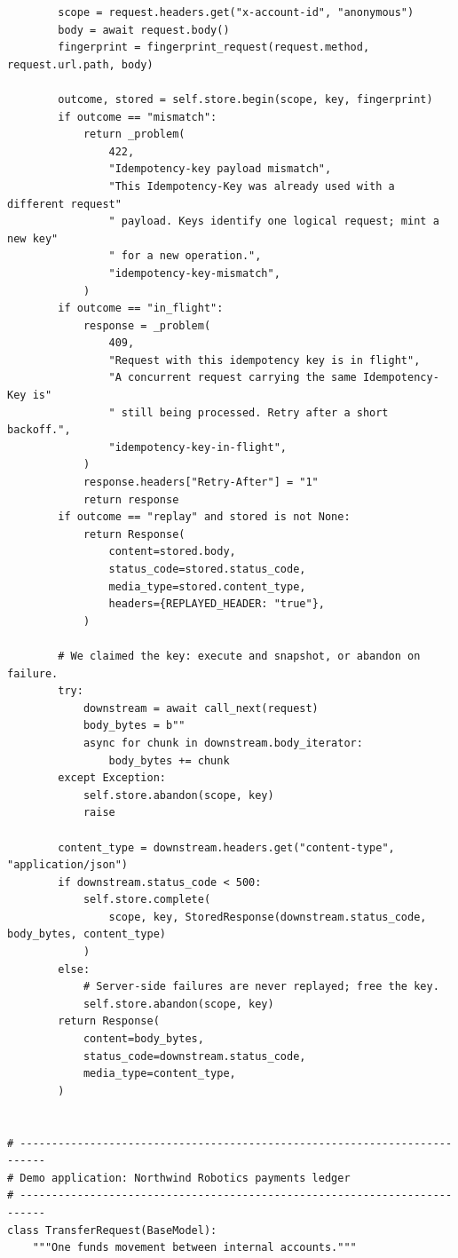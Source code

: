 \begin{verbatim}
        scope = request.headers.get("x-account-id", "anonymous")
        body = await request.body()
        fingerprint = fingerprint_request(request.method, request.url.path, body)

        outcome, stored = self.store.begin(scope, key, fingerprint)
        if outcome == "mismatch":
            return _problem(
                422,
                "Idempotency-key payload mismatch",
                "This Idempotency-Key was already used with a different request"
                " payload. Keys identify one logical request; mint a new key"
                " for a new operation.",
                "idempotency-key-mismatch",
            )
        if outcome == "in_flight":
            response = _problem(
                409,
                "Request with this idempotency key is in flight",
                "A concurrent request carrying the same Idempotency-Key is"
                " still being processed. Retry after a short backoff.",
                "idempotency-key-in-flight",
            )
            response.headers["Retry-After"] = "1"
            return response
        if outcome == "replay" and stored is not None:
            return Response(
                content=stored.body,
                status_code=stored.status_code,
                media_type=stored.content_type,
                headers={REPLAYED_HEADER: "true"},
            )

        # We claimed the key: execute and snapshot, or abandon on failure.
        try:
            downstream = await call_next(request)
            body_bytes = b""
            async for chunk in downstream.body_iterator:
                body_bytes += chunk
        except Exception:
            self.store.abandon(scope, key)
            raise

        content_type = downstream.headers.get("content-type", "application/json")
        if downstream.status_code < 500:
            self.store.complete(
                scope, key, StoredResponse(downstream.status_code, body_bytes, content_type)
            )
        else:
            # Server-side failures are never replayed; free the key.
            self.store.abandon(scope, key)
        return Response(
            content=body_bytes,
            status_code=downstream.status_code,
            media_type=content_type,
        )


# --------------------------------------------------------------------------
# Demo application: Northwind Robotics payments ledger
# --------------------------------------------------------------------------
class TransferRequest(BaseModel):
    """One funds movement between internal accounts."""


\end{verbatim}
